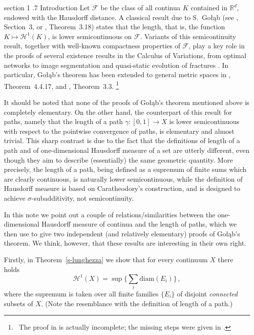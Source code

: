 \documentclass[11pt,reqno,a4paper,final]{amsart}
\makeatletter
\numberwithin{equation}{section}
\theoremstyle{mytheorem}
\theoremstyle{myremark}
\theoremstyle{myparagraph}
\def\section{\@startsection%
{section}%
{1}%
\z@{1.5\linespacing\@plus .2\linespacing}%
  {.7\linespacing}%
  {\normalfont\sc\centering}}%
\newcommand{\footnoteb}[1]{\footnote{~#1}}
\newcommand{\R}{\mathbb{R}}
\newcommand{\F}{\mathscr{F}}
\newcommand{\Haus}{\mathscr{H}}
\newcommand{\Golab}{Go{\l}\k{a}b}
\newcommand{\diam}{\mathrm{diam}}
\makeatother
\begin{document}
\section{Introduction}
Let $\F$ be the class of all continua $K$ contained in $\R^d$, 
endowed with the Hausdorff distance. 
A classical result due to S.~{\Golab} (see \cite{Go}, Section~3, 
or \cite{Fa}, Theorem~3.18)
states that the length, that is, the function  $K\mapsto\Haus^1(K)$, 
is lower semicontinuous on $\F$.
Variants of this semicontinuity result, together with well-known 
compactness properties of $\F$, play a key role in the proofs of 
several existence results in the Calculus of Variations, 
from optimal networks \cite{PS} to image segmentation \cite{DMMS} 
and quasi-static evolution of fractures \cite{DMT}.
In particular, \Golab's theorem has been extended to general metric spaces
in \cite{AT}, Theorem~4.4.17, and \cite{PS}, Theorem~3.3.%
%
\footnoteb{The proof in \cite{AT} is actually incomplete; 
the missing steps were given in \cite{PS}.}
%

\medskip
It should be noted that none of the proofs of \Golab's theorem
mentioned above is completely elementary. 
On the other hand, the counterpart of this result for paths, 
namely that the length of a path $\gamma:[0,1]\to X$ is lower 
semicontinuous with respect to the pointwise convergence of paths, 
is elementary and almost trivial.
This sharp contrast is due to the fact that the definitions of length 
of a path and of one-dimensional Hausdorff measure of a set are 
utterly different, even though they aim to describe (essentially) 
the same geometric quantity. 
More precisely, the length of a path, being defined as a supremum 
of finite sums which are clearly continuous, is naturally lower 
semicontinuous, while the definition of Hausdorff measure is based 
on Caratheodory's construction, and is designed to achieve 
$\sigma$-subadditivity, not semicontinuity.

\medskip
In this note we point out a couple of relations/similarities 
between the one-dimensional Hausdorff measure of continua and the 
length of paths, which we then use to give two independent (and 
relatively elementary) proofs of \Golab's theorem.
We think, however, that these results are interesting in their 
own right.

Firstly, in Theorem~\ref{s-lunghezza} we show that for 
every continuum $X$ there holds
\[
\Haus^1(X) = \sup \bigg\{ \sum_i \diam(E_i) \bigg\} 
\, , 
\]
where the supremum is taken over all finite families $\{E_i\}$
of disjoint \emph{connected} subsets of $X$. 
(Note the resemblance with the definition of length of a path.)
\end{document}

